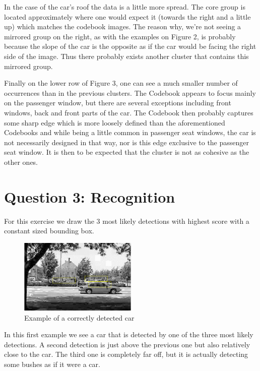 \documentclass[12pt]{article}
\begin{document}
	
	In the case of the car's roof the data is a little more spread. The core group is located approximately where one would expect it (towards the right and a little up) which matches the codebook images. The reason why, we're not seeing a mirrored group on the  right, as with the examples on Figure 2, is probably because the slope of the car is the opposite as if the car would be facing the right side of the image. Thus there probably exists another cluster that contains this mirrored group.
	
	Finally on the lower row of Figure 3, one can see a much smaller number of occurrences than in the previous clusters. The Codebook appears to focus mainly on the passenger window, but there are several exceptions including front windows, back and front parts of the car. The Codebook then probably captures some sharp edge which is more loosely defined than the aforementioned Codebooks and while being a little common in passenger seat windows, the car is not necessarily designed in that way, nor is this edge exclusive to the passenger seat window. It is then to be expected that the cluster is not as cohesive as the other ones.


\newpage
\section*{Question 3: Recognition}
For this exercise we draw the 3 most likely detections with highest score with a constant sized bounding box. 



\begin{figure}[H]
	\begin{center}
	\includegraphics[width=0.5\textwidth]{eva2}
	
	\caption{Example of a correctly detected car }
\end{center}
\end{figure}
In this first example we see a car that is detected by one of the three most likely detections. A second detection is just above the previous one but also relatively close to the car. The third one is completely far off, but it is actually detecting some bushes as if it were a car.
\end{document}
